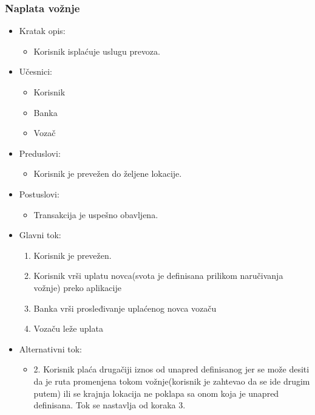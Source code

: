 \subsubsection{\bfseries Naplata vo\v znje}
\begin{itemize}
	\item Kratak opis:
		\begin{itemize}
			\item Korisnik isplaćuje uslugu prevoza.
		\end{itemize}
 
	\item Učesnici:
		\begin{itemize}
			\item Korisnik
			\item Banka
			\item Vozač
		\end{itemize}				

	\item Preduslovi:
		\begin{itemize}
		    \item Korisnik je prevežen do željene lokacije.
		\end{itemize}

	\item Postuslovi:
		\begin{itemize}
			\item Transakcija je uspešno obavljena.
		\end{itemize}		


	\item Glavni tok:
		\begin{enumerate}
		    \item Korisnik je prevežen.
		    \item Korisnik vrši uplatu novca(svota je definisana prilikom naručivanja vožnje) preko aplikacije
		    \item Banka vrši prosleđivanje uplaćenog novca vozaču
		    \item Vozaču leže uplata
		     
		\end{enumerate}

	\item Alternativni tok:
		\begin{itemize}
    		\item 2. Korisnik plaća drugačiji iznos od unapred definisanog jer se može desiti da je ruta promenjena tokom vožnje(korisnik je zahtevao da se ide drugim putem) ili se krajnja lokacija ne poklapa sa onom koja je unapred definisana. Tok se nastavlja od koraka 3.
		\end{itemize}
\end{itemize}

